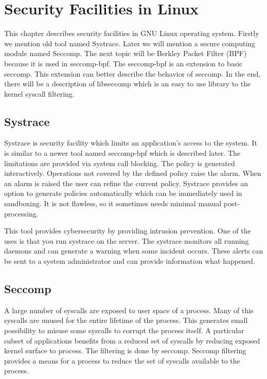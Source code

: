 \chapter{Security Facilities in Linux}
This chapter describes security facilities in GNU Linux operating system.
Firstly we mention old tool named Systrace\cite{systrace_web}.
Later we will mention a secure computing module named Seccomp\cite{seccomp_sandbox}.
The next topic will be Berkley Packet Filter (BPF) because it is used in seccomp-bpf.
The seccomp-bpf is an extension to basic seccomp.
This extension can better describe the behavior of seccomp.
In the end, there will be a description of libseccomp which is an easy to use library to the kernel syscall filtering.

\section{Systrace}
Systrace is security facility which limits an application's access to the system.
It is similar to a newer tool named seccomp-bpf which is described later.
The limitations are provided via system call blocking.
The policy is generated interactively.
Operations not covered by the defined policy raise the alarm.
When an alarm is raised the user can refine the current policy.
Systrace provides an option to generate policies automatically which can be immediately used in sandboxing.
It is not flawless, so it sometimes needs minimal manual post-processing.

This tool provides cybersecurity by providing intrusion prevention.
One of the uses is that you run systrace on the server.
The systrace monitors all running daemons and can generate a warning when some incident occurs.
These alerts can be sent to a system administrator and can provide information what happened.

\section{Seccomp}
A large number of syscalls are exposed to user space of a process.
Many of this syscalls are unused for the entire lifetime of the process.
This generates small possibility to misuse some syscalls to corrupt the process itself.
A particular subset of applications benefits from a reduced set of syscalls by reducing exposed kernel surface to process.
The filtering is done by seccomp.
Seccomp filtering provides a means for a process to reduce the set of syscalls available to the process\cite{seccomp_kernel_doc}.


